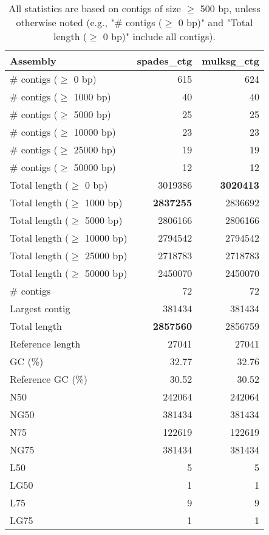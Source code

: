 \documentclass[12pt,a4paper]{article}
\begin{document}
\begin{table}[ht]
\begin{center}
\caption{All statistics are based on contigs of size $\geq$ 500 bp, unless otherwise noted (e.g., "\# contigs ($\geq$ 0 bp)" and "Total length ($\geq$ 0 bp)" include all contigs).}
\begin{tabular}{|l*{2}{|r}|}
\hline
Assembly & spades\_ctg & mulksg\_ctg \\ \hline
\# contigs ($\geq$ 0 bp) & 615 & 624 \\ \hline
\# contigs ($\geq$ 1000 bp) & 40 & 40 \\ \hline
\# contigs ($\geq$ 5000 bp) & 25 & 25 \\ \hline
\# contigs ($\geq$ 10000 bp) & 23 & 23 \\ \hline
\# contigs ($\geq$ 25000 bp) & 19 & 19 \\ \hline
\# contigs ($\geq$ 50000 bp) & 12 & 12 \\ \hline
Total length ($\geq$ 0 bp) & 3019386 & {\bf 3020413} \\ \hline
Total length ($\geq$ 1000 bp) & {\bf 2837255} & 2836692 \\ \hline
Total length ($\geq$ 5000 bp) & 2806166 & 2806166 \\ \hline
Total length ($\geq$ 10000 bp) & 2794542 & 2794542 \\ \hline
Total length ($\geq$ 25000 bp) & 2718783 & 2718783 \\ \hline
Total length ($\geq$ 50000 bp) & 2450070 & 2450070 \\ \hline
\# contigs & 72 & 72 \\ \hline
Largest contig & 381434 & 381434 \\ \hline
Total length & {\bf 2857560} & 2856759 \\ \hline
Reference length & 27041 & 27041 \\ \hline
GC (\%) & 32.77 & 32.76 \\ \hline
Reference GC (\%) & 30.52 & 30.52 \\ \hline
N50 & 242064 & 242064 \\ \hline
NG50 & 381434 & 381434 \\ \hline
N75 & 122619 & 122619 \\ \hline
NG75 & 381434 & 381434 \\ \hline
L50 & 5 & 5 \\ \hline
LG50 & 1 & 1 \\ \hline
L75 & 9 & 9 \\ \hline
LG75 & 1 & 1 \\ \hline

\end{tabular}
\end{center}
\end{table}
\end{document}
